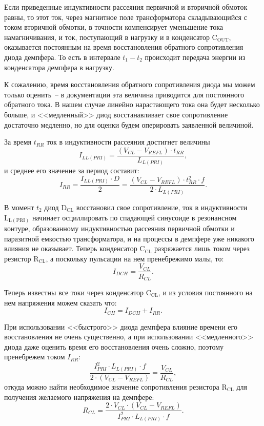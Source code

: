 Если приведенные индуктивности рассеяния первичной и вторичной обмоток равны, то
этот ток, через магнитное поле трансформатора складывающийся с током вторичной
обмотки, в точности компенсирует уменьшение тока намагничивания, и ток,
поступающий в нагрузку и в конденсатор \( \mathrm{C_{OUT}} \), оказывается
постоянным на время восстановления обратного сопротивления диода демпфера. То
есть в интервале \( t_1 - t_2 \) происходит передача энергии из конденсатора
демпфера в нагрузку.

К сожалению, время восстановления обратного сопротивления диода мы можем только
оценить~-- в документации эта величина приводится для постоянного обратного
тока. В нашем случае линейно нарастающего тока она будет несколько больше, и
<<медленный>> диод восстанавливает свое сопротивление достаточно медленно, но
для оценки будем оперировать заявленной величиной.

За время \( t_{RR} \) ток в индуктивности рассеяния достигнет величины
\begin{equation}
	I_{LL(PRI)} = \frac{(V_{CL} - V_{REFL})\cdot t_{RR}}{L_{L(PRI)}},
\end{equation}
и среднее его значение за период составит:
\begin{equation}
	I_{RR} = \frac{I_{LL(PRI)}\cdot D}{2} = \frac{(V_{CL} - V_{REFL})\cdot t_{RR}^2
	\cdot f}{2\cdot L_{L(PRI)}}.
\end{equation}

В момент \( t_2 \) диод \( \mathrm{D_{CL}} \) восстановил свое сопротивление,
ток в индуктивности \( \mathrm{L_{L(PRI)}} \) начинает осциллировать по
спадающей синусоиде в резонансном контуре, образованному индуктивностью
рассеяния первичной обмотки и паразитной емкостью трансформатора, и на процессы
в демпфере уже никакого влияния не оказывает. Теперь конденсатор
\( \mathrm{C_{CL}} \) разряжается лишь током через резистор
\( \mathrm{R_{CL}} \), а поскольку пульсации на нем пренебрежимо малы, то:
\begin{equation}
	I_{DCH} = \frac{V_{CL}}{R_{CL}}.
\end{equation} 
 
Теперь известны все токи через конденсатор \( \mathrm{C_{CL}} \), и из условия
постоянного на нем напряжения можем сказать что:
\begin{equation}
	I_{CH} = I_{DCH} + I_{RR}.
\end{equation}
 
При использовании <<быстрого>> диода демпфера влияние времени его восстановления не 
очень существенно, а при использовании <<медленного>> диода даже оценить время его 
восстановления очень сложно, поэтому пренебрежем током \( I_{RR} \): 
\begin{equation}
	\frac{I_{PRI}^2\cdot L_{L(PRI)}\cdot f}{2\cdot (V_{CL} - V_{REFL})} =
	\frac{V_{CL}}{R_{CL}},
\end{equation}
откуда можно найти необходимое значение сопротивления резистора
\( \mathrm{R_{CL}} \) для получения желаемого напряжения на демпфере:
\begin{equation}
	R_{CL} = \frac{2\cdot V_{CL}\cdot (V_{CL} - V_{REFL})}
	{I_{PRI}^2\cdot L_{L(PRI)}\cdot f}.
\end{equation}
 
